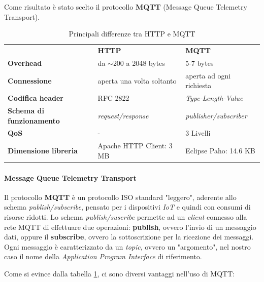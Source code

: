 \documentclass[a4paper,10pt]{memoir}
\begin{document}
Come risultato è stato scelto il protocollo \textbf{MQTT} (Message Queue Telemetry Transport).


\begin{table}[h]
\centering
\caption{Principali differenze tra HTTP e MQTT}
\label{table:mqttdiff}
\begin{tabular}{lll}
                    & \textbf{HTTP} & \textbf{MQTT} \\
\textbf{Overhead} & da $\sim$200 a 2048 bytes & 5-7 bytes \\
\textbf{Connessione} & aperta una volta soltanto & aperta ad ogni richiesta \\
\textbf{Codifica header} & RFC 2822 & \textit{Type-Length-Value} \\
\textbf{Schema di funzionamento} & \textit{request/response} & \textit{publisher/subscriber} \\
\textbf{QoS} & - & 3 Livelli \\
\textbf{Dimensione libreria} & Apache HTTP Client: 3 MB & Eclipse Paho: 14.6 KB \\
\end{tabular}
\end{table}

\paragraph{Message Queue Telemetry Transport} Il protocollo \textbf{MQTT} è un protocollo ISO standard "leggero", aderente allo schema \textit{publish/subscribe}, pensato per i dispositivi \textit{IoT} e quindi con consumi di risorse ridotti. Lo schema \textit{publish/suscribe} permette ad un \textit{client} connesso alla rete MQTT di effettuare due operazioni: \textbf{publish}, ovvero l'invio di un messaggio dati, oppure il \textbf{subscribe}, ovvero la sottoscrizione per la ricezione dei messaggi. Ogni messaggio è caratterizzato da un \textit{topic}, ovvero un "argomento", nel nostro caso il nome della \textit{Application Program Interface} di riferimento.

Come si evince dalla tabella \ref{table:mqttdiff}, ci sono diversi vantaggi nell'uso di MQTT:
\end{document}
